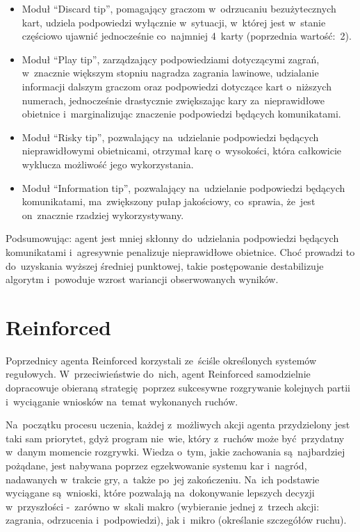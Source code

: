 \documentclass[declaration,shortabstract,inz]{iithesis}
\begin{document}
\begin{itemize}
	\item Moduł ``Discard tip'', pomagający graczom w~odrzucaniu bezużytecznych kart, udziela podpowiedzi wyłącznie w~sytuacji, w~której jest w~stanie częściowo ujawnić jednocześnie co~najmniej 4~karty (poprzednia wartość:~2).
	\item Moduł ``Play tip'', zarządzający podpowiedziami dotyczącymi zagrań, w~znacznie większym stopniu nagradza zagrania lawinowe, udzialanie informacji dalszym graczom oraz podpowiedzi dotyczące kart o~niższych numerach, jednocześnie drastycznie zwiększając kary za~nieprawidłowe obietnice i~marginalizując znaczenie podpowiedzi będących komunikatami.
	\item Moduł ``Risky tip'', pozwalający na~udzielanie podpowiedzi będących nieprawidłowymi obietnicami, otrzymał karę o~wysokości, która całkowicie wyklucza możliwość jego wykorzystania.
	\item Moduł ``Information tip'', pozwalający na~udzielanie podpowiedzi będących komunikatami, ma~zwiększony pułap jakościowy, co~sprawia, że~jest on~znacznie rzadziej wykorzystywany.
\end{itemize}

Podsumowując: agent jest mniej skłonny do~udzielania podpowiedzi będących komunikatami i~agresywnie penalizuje nieprawidłowe obietnice. Choć prowadzi to do~uzyskania wyższej średniej punktowej, takie postępowanie destabilizuje algorytm i~powoduje wzrost wariancji obserwowanych wyników.

\section{Reinforced}

Poprzednicy agenta Reinforced korzystali ze~ściśle określonych systemów regułowych. W~przeciwieństwie do~nich, agent Reinforced samodzielnie dopracowuje obieraną strategię poprzez sukcesywne rozgrywanie kolejnych partii i~wyciąganie wniosków na~temat wykonanych ruchów.

Na~początku procesu uczenia, każdej z~możliwych akcji agenta przydzielony jest taki sam priorytet, gdyż program nie~wie, który z~ruchów może być przydatny w~danym momencie rozgrywki. Wiedza o~tym, jakie zachowania są~najbardziej pożądane, jest nabywana poprzez egzekwowanie systemu kar i~nagród, nadawanych w~trakcie gry, a~także po~jej zakończeniu. Na~ich podstawie wyciągane są~wnioski, które pozwalają na~dokonywanie lepszych decyzji w~przyszłości -~zarówno w~skali makro (wybieranie jednej z~trzech akcji: zagrania, odrzucenia i~podpowiedzi), jak i~mikro (określanie szczegółów ruchu).
\end{document}
